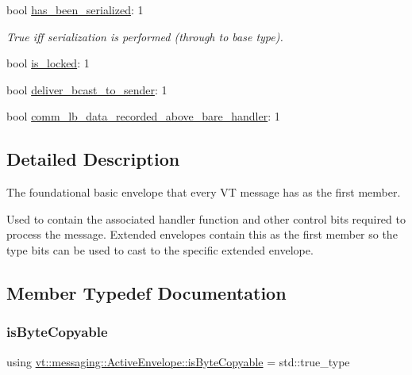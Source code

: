 \begin{DoxyCompactItemize}
bool \hyperlink{structvt_1_1messaging_1_1_active_envelope_a340d6eae2a23ce99dc3e06f1ae2a5b81}{has\+\_\+been\+\_\+serialized}\+: 1
\begin{DoxyCompactList}\small\item\em True iff serialization is performed (through to base type). \end{DoxyCompactList}\item 
bool \hyperlink{structvt_1_1messaging_1_1_active_envelope_a17ded970dbc5c61160848d5ecf5c57ab}{is\+\_\+locked}\+: 1
\item 
bool \hyperlink{structvt_1_1messaging_1_1_active_envelope_aba7a8aaed2a99d0bfd72890e07397c0b}{deliver\+\_\+bcast\+\_\+to\+\_\+sender}\+: 1
\item 
bool \hyperlink{structvt_1_1messaging_1_1_active_envelope_afa732eed06a62623137230d15189ac63}{comm\+\_\+lb\+\_\+data\+\_\+recorded\+\_\+above\+\_\+bare\+\_\+handler}\+: 1
\end{DoxyCompactItemize}


\subsection{Detailed Description}
The foundational basic envelope that every VT message has as the first member. 

Used to contain the associated handler function and other control bits required to process the message. Extended envelopes contain this as the first member so the type bits can be used to cast to the specific extended envelope. 

\subsection{Member Typedef Documentation}
\mbox{\label{structvt_1_1messaging_1_1_active_envelope_ad9d4a03838736cf7240bd25bc317fd3c}} 
\subsubsection{\texorpdfstring{is\+Byte\+Copyable}{isByteCopyable}}
{\footnotesize\ttfamily using \hyperlink{structvt_1_1messaging_1_1_active_envelope_ad9d4a03838736cf7240bd25bc317fd3c}{vt\+::messaging\+::\+Active\+Envelope\+::is\+Byte\+Copyable} =  std\+::true\+\_\+type}




